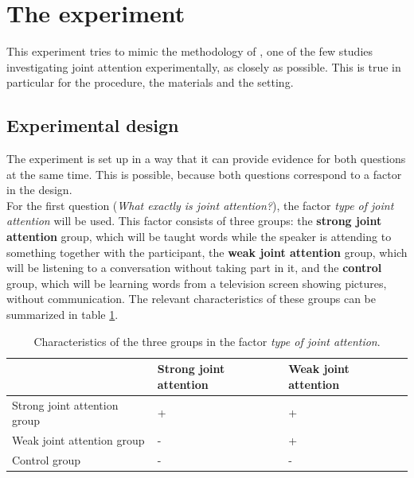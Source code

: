 \documentclass[12pt]{article}
\let\stdsection\section
\renewcommand\section{\newpage\stdsection}
\begin{document}
\section{The experiment} \label{exp}

This experiment tries to mimic the methodology of \citet{ddc93}, one of the few studies investigating joint attention experimentally, as closely as possible. This is true in particular for the procedure, the materials and the setting.

\subsection{Experimental design}

The experiment is set up in a way that it can provide evidence for both questions at the same time. This is possible, because both questions correspond to a factor in the design. \\\indent
For the first question (\emph{What exactly is joint attention?}), the factor \emph{type of joint attention} will be used. This factor consists of three groups: the \textbf{strong joint attention} group, which will be taught words while the speaker is attending to something together with the participant, the \textbf{weak joint attention} group, which will be listening to a conversation without taking part in it, and the \textbf{control} group, which will be learning words from a television screen showing pictures, without communication. The relevant characteristics of these groups can be summarized in table \ref{jagroups}.

\begin{table}[h] 
\begin{tabular}{|l||l|l|} 
\hline
&Strong joint attention&Weak joint attention\\
\hline
\hline
Strong joint attention group&+&+\\
\hline
Weak joint attention group&-&+\\
\hline
Control group&-&-\\
\hline
\end{tabular}
\caption{Characteristics of the three groups in the factor \emph{type of joint attention}.}
\label{jagroups}
\end{table}
\end{document}
